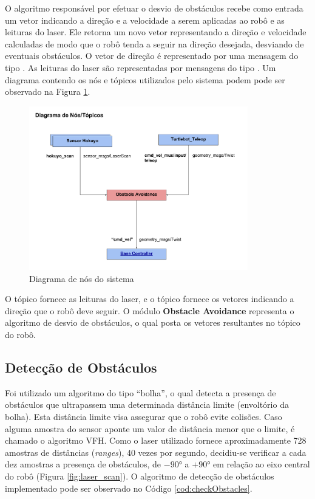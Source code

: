 O algoritmo responsável por efetuar o desvio de obstáculos recebe como
entrada um vetor indicando a direção e a velocidade a serem aplicadas
ao robô e as leituras do laser. Ele retorna um novo vetor
representando a direção e velocidade calculadas de modo que o robô
tenda a seguir na direção desejada, desviando de eventuais obstáculos.
O vetor de direção é representado por uma mensagem do tipo
. As leituras do laser são representadas
por mensagens do tipo . Um diagrama
contendo os nós e tópicos utilizados pelo sistema podem pode ser
observado na Figura \ref{fig:diag_proj_ros}.

\begin{figure}[H]
    \centering
    \includegraphics[width=0.85\textwidth]{img/Diagrama_Projeto_ROS.pdf}
    \caption{Diagrama de nós do sistema}
    \label{fig:diag_proj_ros}
\end{figure}

O tópico  fornece as leituras do laser, e o tópico
 fornece os vetores indicando a direção que
o robô deve seguir. O módulo \textbf{Obstacle Avoidance} representa o
algoritmo de desvio de obstáculos, o qual posta os vetores resultantes
no tópico  do robô.

\subsection{Detecção de Obstáculos}

Foi utilizado um algoritmo do tipo ``bolha'', o qual detecta a
presença de obstáculos que ultrapassem uma determinada distância
limite (envoltório da bolha). Esta distância limite visa assegurar que
o robô evite colisões. Caso alguma amostra do sensor aponte um valor
de distância menor que o limite, é chamado o algoritmo VFH. Como o
laser utilizado fornece aproximadamente 728 amostras de distâncias
(\textit{ranges}), 40 vezes por segundo, decidiu-se verificar a cada
dez amostras a presença de obstáculos, de $-90°$ a $+90°$ em relação
ao eixo central do robô (Figura \ref{fig:laser_scan}). O algoritmo de
detecção de obstáculos implementado pode ser observado no Código
\ref{cod:checkObstacles}.

